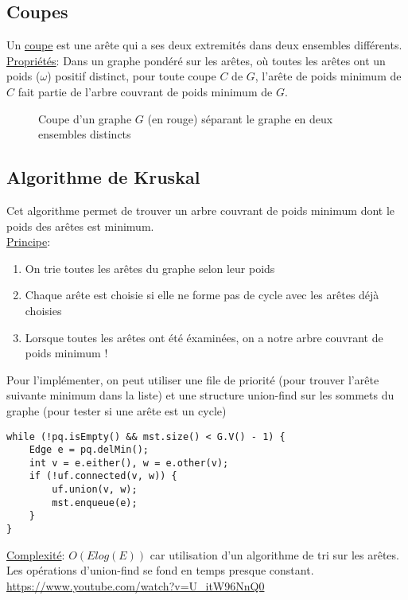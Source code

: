 \documentclass[10pt]{article}
\begin{document}
\subsection{Coupes}
Un \underline{coupe} est une arête qui a ses deux extremités dans deux ensembles différents.
\\ \underline{Propriétés}: Dans un graphe pondéré sur les arêtes, où toutes les arêtes ont un poids ($\omega$) positif distinct, pour toute coupe $C$ de $G$, l'arête de poids minimum de $C$ fait partie de l'arbre couvrant de poids minimum de $G$.
\begin{figure}[H]
\caption{Coupe d'un graphe $G$ (en rouge) séparant le graphe en deux ensembles distincts}
\label{fig:cfc_inverse}
\end{figure}

\subsection{Algorithme de Kruskal}
Cet algorithme permet de trouver un arbre couvrant de poids minimum dont le poids des arêtes est minimum.
\\
\underline{Principe}:
\begin{enumerate}
\item On trie toutes les arêtes du graphe selon leur poids
\item Chaque arête est choisie si elle ne forme pas de cycle avec les arêtes déjà choisies
\item Lorsque toutes les arêtes ont été éxaminées, on a notre arbre couvrant de poids minimum !
\end{enumerate}

Pour l'implémenter, on peut utiliser une file de priorité (pour trouver l'arête suivante minimum dans la liste) et une structure union-find sur les sommets du graphe (pour tester si une arête est un cycle)
\begin{verbatim}
while (!pq.isEmpty() && mst.size() < G.V() - 1) {
	Edge e = pq.delMin();
	int v = e.either(), w = e.other(v);
	if (!uf.connected(v, w)) {
		uf.union(v, w);
		mst.enqueue(e);
	}
}
\end{verbatim}

\underline{Complexité}: $O(Elog(E))$ car utilisation d'un algorithme de tri sur les arêtes. Les opérations d'union-find se fond en temps presque constant.
\\\url{https://www.youtube.com/watch?v=U_itW96NnQ0}
\end{document}
